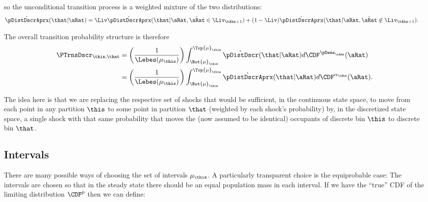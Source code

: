 \documentclass[../BufferStockTheory.tex]{subfiles}\usepackage{ApndxSteadyState}
\begin{document}
  so the unconditional transition process is a weighted mixture of the two distributions:
  \begin{equation}\begin{gathered}\begin{aligned}
    \Nxt{\pDistDscrAprx}(\that|\point)  &= \Liv\Nxt{\pDistDscrAprx}(\that|\point,\Nxt{\point}\in\Liv_{\tAbs+1}) + (1-\Liv)    \Nxt{\pDistDscrAprx}(\that|\point,\Nxt{\point}\notin\Liv_{\tAbs+1}).
  \end{aligned}\end{gathered}\end{equation}
  

  The overall transition probability structure is therefore 
  \begin{equation}\begin{gathered}\begin{aligned}
    \PTrnsDscr_{\this,\that}& = \left(\frac{1}{\Lebes(\SetSub_{\this})}\right)  \int_{\Bot{\SetSub}_{\this}}^{\Top{\SetSub}_{\this}} \Nxt{\pDistDscr}(\that|\point) d\CDF^{\pDens_{\tAbs}}(\point)
\\ & = \left(\frac{1}{\Lebes(\SetSub_{\this})}\right)  \int_{\Bot{\SetSub}_{\this}}^{\Top{\SetSub}_{\this}} \Nxt{\pDistDscrAprx}(\that|\point) d\CDF^{\pContAprx_{\tAbs}}(\point)                              .
  \end{aligned}\end{gathered}\end{equation}

  The idea here is that we are replacing the respective set of shocks that would be sufficient, in the continuous state space, to move from each point in any partition $\this$ to some point in partition $\that$ (weighted by each shock's probability) by, in the discretized state space, a single shock with that same probability that moves the (now assumed to be identical) occupants of discrete bin ${\this}$ to discrete bin ${\that}$.

  \subsection{Intervals}

  There are many possible ways of choosing the set of intervals $\SetSub_{\this}$.  A particularly transparent choice is the equiprobable case: The intervals are chosen so that in the steady state there should be an equal population mass in each interval.  If we have the ``true'' CDF of the limiting distribution $\CDF^{\pLog}$ then we can define:
\end{document}
